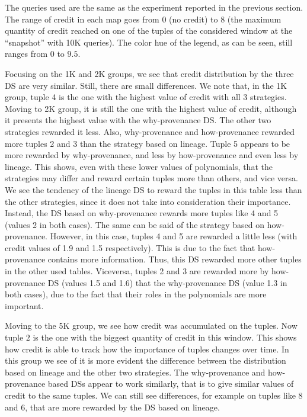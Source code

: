 The queries used are the same as the experiment reported in the previous section. The range of credit in each map goes from 0 (no credit) to 8 (the maximum quantity of credit reached on one of the tuples of the considered window at the ``snapshot'' with 10K queries). The color hue of the legend, as can be seen, still ranges from $0$ to $9.5$.


Focusing on the 1K and 2K groups, we see that credit distribution by the three DS are very similar. Still, there are small differences.
We note that, in the 1K group, tuple 4 is the one with the highest value of credit with all 3 strategies. Moving to 2K group, it is still the one with the highest value of credit, although it presents the highest value with the why-provenance DS. The other two strategies rewarded it less. 
Also, why-provenance and how-provenance rewarded more tuples 2 and 3 than the strategy based on lineage. 
Tuple 5 appears to be more rewarded by why-provenance, and less by how-provenance and even less by lineage. 
This shows, even with these lower values of polynomials, that the strategies may differ and reward certain tuples more than others, and vice versa. 
We see the tendency of the lineage DS to reward the tuples in this table less than the other strategies, since it does not take into consideration their importance. 
Instead, the DS based on why-provenance rewards more tuples like 4 and 5 (values 2 in both cases). 
The same can be said of the strategy based on how-provenance. However, in this case, tuples 4 and 5 are rewarded a little less (with credit values of 1.9 and 1.5 respectively). This is due to the fact that how-provenance contains more information. Thus, this DS rewarded more other tuples in the other used tables. Viceversa, tuples 2 and 3 are rewarded more by how-provenance DS (values 1.5 and 1.6) that the why-provenance DS (value 1.3 in both cases), due to the fact that their roles in the polynomials are more important.  

Moving to the 5K group, we see how credit was accumulated on the tuples. Now tuple $2$ is the one with the biggest quantity of credit in this window. This shows how credit is able to track how the importance of tuples changes over time. 
In this group we see of it is more evident the difference between the distribution based on lineage and the other two strategies. The why-provenance and how-provenance based DSs appear to work similarly, that is to give similar values of credit to the same tuples. 
We can still see differences, for example on tuples like 8 and 6, that are more rewarded by the DS based on lineage.

